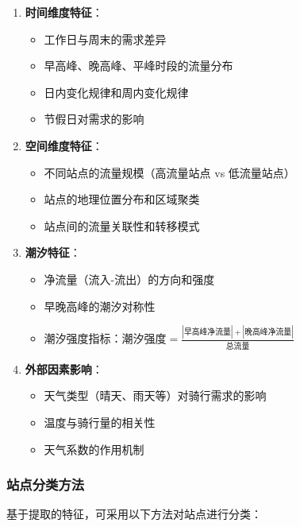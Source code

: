 \documentclass[12pt,a4paper]{ctexart}
\begin{document}
\begin{enumerate}
    \item \textbf{时间维度特征}：
    \begin{itemize}
        \item 工作日与周末的需求差异
        \item 早高峰、晚高峰、平峰时段的流量分布
        \item 日内变化规律和周内变化规律
        \item 节假日对需求的影响
    \end{itemize}

    \item \textbf{空间维度特征}：
    \begin{itemize}
        \item 不同站点的流量规模（高流量站点 vs 低流量站点）
        \item 站点的地理位置分布和区域聚类
        \item 站点间的流量关联性和转移模式
    \end{itemize}

    \item \textbf{潮汐特征}：
    \begin{itemize}
        \item 净流量（流入-流出）的方向和强度
        \item 早晚高峰的潮汐对称性
        \item 潮汐强度指标：$\text{潮汐强度} = \frac{|\text{早高峰净流量}| + |\text{晚高峰净流量}|}{\text{总流量}}$
    \end{itemize}

    \item \textbf{外部因素影响}：
    \begin{itemize}
        \item 天气类型（晴天、雨天等）对骑行需求的影响
        \item 温度与骑行量的相关性
        \item 天气系数的作用机制
    \end{itemize}
\end{enumerate}

\subsubsection{站点分类方法}

基于提取的特征，可采用以下方法对站点进行分类：
\end{document}
